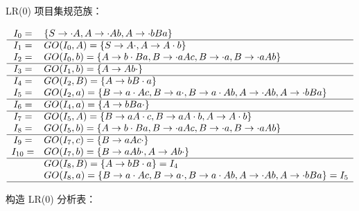 \begin{enumerate}
    LR(0) 项目集规范族：
    
    \begin{equation*}
        \begin{array}{cl}
            I_0 = & \{S \to \cdot A, A \to \cdot Ab, A \to \cdot bBa\} \\
            \hline
            I_1 = & GO(I_0, A) = \{S \to A \cdot, A \to A \cdot b \} \\
            I_2 = & GO(I_0, b) = \{A \to b \cdot Ba, B \to \cdot aAc, B \to \cdot a, B \to \cdot aAb \}\\
            \hline
            I_3 = & GO(I_1, b) = \{A \to Ab \cdot\} \\
            \hline
            I_4 = & GO(I_2, B) = \{A \to bB \cdot a\} \\
            I_5 = & GO(I_2, a) = \{B \to a \cdot Ac, B \to a \cdot, B \to a \cdot Ab, A \to \cdot Ab, A \to \cdot bBa\} \\
            \hline
            I_6 = & GO(I_4, a) = \{A \to bBa \cdot \} \\
            \hline
            I_7 = & GO(I_5, A) = \{B \to aA \cdot c, B \to aA \cdot b, A \to A \cdot b \} \\
            I_8 = & GO(I_5, b) = \{A \to b \cdot Ba, B \to \cdot aAc, B \to \cdot a, B \to \cdot aAb \} \\
            \hline
            I_9 = & GO(I_7, c) = \{B \to aAc \cdot\} \\
            I_{10} = & GO(I_7, b) = \{B \to aAb \cdot, A \to Ab \cdot\} \\
            \hline
                  & GO(I_8, B) = \{A \to bB \cdot a\} = I_4 \\
                  & GO(I_8, a) = \{B \to a \cdot Ac, B \to a \cdot, B \to a \cdot Ab, A \to \cdot Ab, A \to \cdot bBa\} = I_5 \\
            \hline
        \end{array}
    \end{equation*}
    
    构造 LR(0) 分析表：
    

\end{enumerate}
